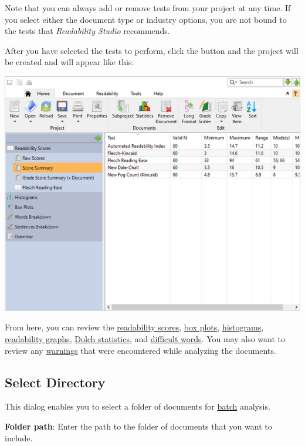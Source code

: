\documentclass[
]{book}
\theoremstyle{definition}
\theoremstyle{definition}
\theoremstyle{definition}
\theoremstyle{definition}
\theoremstyle{remark}
\begin{document}
Note that you can always add or remove tests from your project at any time. If you select either the document type or industry options, you are not bound to the tests that \emph{Readability Studio} recommends.

After you have selected the tests to perform, click the  button and the project will be created and will appear like this:

\includegraphics{Images/batchscorestats.png}

From here, you can review the \protect\hyperlink{reviewing-batch-scores}{readability scores}, \protect\hyperlink{reviewing-batch-box-plots}{box plots}, \protect\hyperlink{reviewing-batch-histograms}{histograms}, \protect\hyperlink{reviewing-readability-graphs}{readability graphs}, \protect\hyperlink{reviewing-batch-dolch}{Dolch statistics}, and \protect\hyperlink{reviewing-batch-words}{difficult words}. You may also want to review any \protect\hyperlink{reviewing-batch-warnings}{warnings} that were encountered while analyzing the documents.

\hypertarget{select-directory}{%
\subsection*{Select Directory}\label{select-directory}}

This dialog enables you to select a folder of documents for \protect\hyperlink{creating-batch-project}{batch} analysis.

\textbf{Folder path}: Enter the path to the folder of documents that you want to include.
\end{document}
